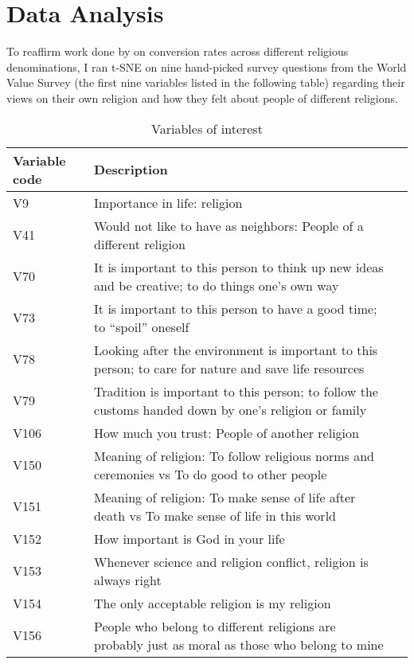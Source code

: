 \documentclass{article}
\begin{document}
	\section{Data Analysis}
	To reaffirm work done by \cite{relig_convert} on conversion rates across different religious denominations, I ran t-SNE on nine hand-picked survey questions from the World Value Survey (the first nine variables listed in the following table) regarding their views on their own religion and how they felt about people of different religions.
	
	\begin{table}[h]
		\caption{Variables of interest}
		\label{wvs-vars}
		\centering
		\begin{tabular}{lll}
			\toprule
			Variable code & Description  \\
			\midrule
			V9 & Importance in life: religion \\
			V41 & Would not like to have as neighbors: People of a different religion \\
			V70 & It is important to this person to think up new ideas and be creative; to do things one’s own way \\
			V73 & It is important to this person to have a good time; to “spoil” oneself \\
			V78 & Looking after the environment is important to this person; to care for nature and save life resources \\
			V79 & Tradition is important to this person; to follow the customs handed down by one’s religion or family \\
			V106 & How much you trust: People of another religion \\
			V150 & Meaning of religion: To follow religious norms and ceremonies vs To do good to other people \\
			V151 & Meaning of religion: To make sense of life after death vs To make sense of life in this world \\
			V152 & How important is God in your life \\
			V153 & Whenever science and religion conflict, religion is always right \\
			V154 & The only acceptable religion is my religion \\
			V156 & People who belong to different religions are probably just as moral as those who belong to mine \\
			\bottomrule
		\end{tabular}
	\end{table}
	
\end{document}
